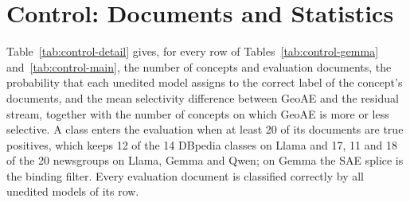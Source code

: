 \documentclass[11pt]{article}
\begin{document}
\section{Control: Documents and Statistics}
\label{app:control}

Table~\ref{tab:control-detail} gives, for every row of Tables~\ref{tab:control-gemma} and~\ref{tab:control-main}, the number of concepts and evaluation documents, the probability that each unedited model assigns to the correct label of the concept's documents, and the mean selectivity difference between GeoAE and the residual stream, together with the number of concepts on which GeoAE is more or less selective.
A class enters the evaluation when at least 20 of its documents are true positives, which keeps 12 of the 14 DBpedia classes on Llama and 17, 11 and 18 of the 20 newsgroups on Llama, Gemma and Qwen; on Gemma the SAE splice is the binding filter.
Every evaluation document is classified correctly by all unedited models of its row.
\end{document}
